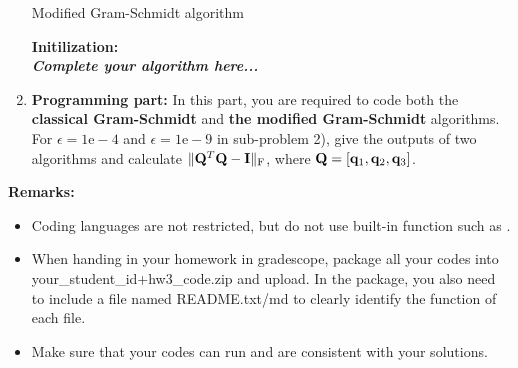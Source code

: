 \documentclass[english,onecolumn]{IEEEtran}
\begin{document}
\begin{enumerate}
	\begin{algorithm}[htbp]
	\label{alg:modified_gs}
\caption{Modified Gram-Schmidt algorithm}
\SetAlgoLined
{}
\textbf{Initilization:}\\
\textbf{\textit{Complete your algorithm here...}}\\
\end{algorithm}
	\item \textbf{Programming part:}
	In this part, you are required to code both the \textbf{ classical Gram-Schmidt} and \textbf{the modified Gram-Schmidt} algorithms.
	For $\epsilon=1\text{e}-4$ and $\epsilon=1\text{e}-9$ in sub-problem 2), give the outputs of two algorithms and calculate $\|{\bf Q}^T {\bf Q} - {\bf I}\|_{\text{F}}$, where ${\bf Q} = [{\bf q}_1,{\bf q}_2,{\bf q}_3]$.
\end{enumerate}
\noindent\textbf{Remarks: }
\begin{itemize}
    \item Coding languages are not restricted, but do not use built-in function such as .
    \item When handing in your homework in gradescope, package all your codes into {\sf your\_student\_id+hw3\_code.zip} and upload. In the package, you also need to include a file named {\sf README.txt/md} to clearly identify the function of each file.
     \item Make sure that your codes can run and are consistent with your solutions.
\end{itemize}
\end{document}
